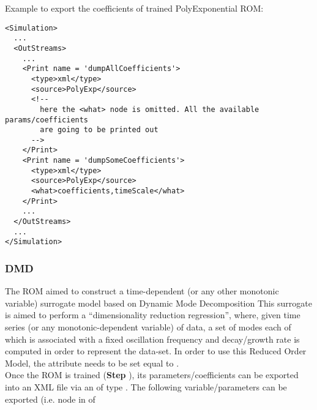 Example to export the coefficients of trained PolyExponential ROM:
\begin{lstlisting}[style=XML,morekeywords={name,subType}]
<Simulation>
  ...
  <OutStreams>
    ...
    <Print name = 'dumpAllCoefficients'>
      <type>xml</type>
      <source>PolyExp</source>
      <!--
        here the <what> node is omitted. All the available params/coefficients
        are going to be printed out
      -->
    </Print>
    <Print name = 'dumpSomeCoefficients'>
      <type>xml</type>
      <source>PolyExp</source>
      <what>coefficients,timeScale</what>
    </Print>
    ...
  </OutStreams>
  ...
</Simulation>
\end{lstlisting}


\subsubsection{DMD}
  The  ROM aimed to construct a time-dependent (or any other monotonic
  variable) surrogate model based on Dynamic Mode Decomposition         This surrogate is aimed to
  perform a ``dimensionality reduction regression'', where, given time         series (or any
  monotonic-dependent variable) of data, a set of modes each of which is associated         with a
  fixed oscillation frequency and decay/growth rate is computed         in order to represent the
  data-set.         In order to use this Reduced Order Model, the  attribute
   needs to be set equal to .         \\         Once the ROM  is
  trained (\textbf{Step} ), its parameters/coefficients can be exported into an
  XML file         via an  of type . The following
  variable/parameters can be exported (i.e.  node         in  of
